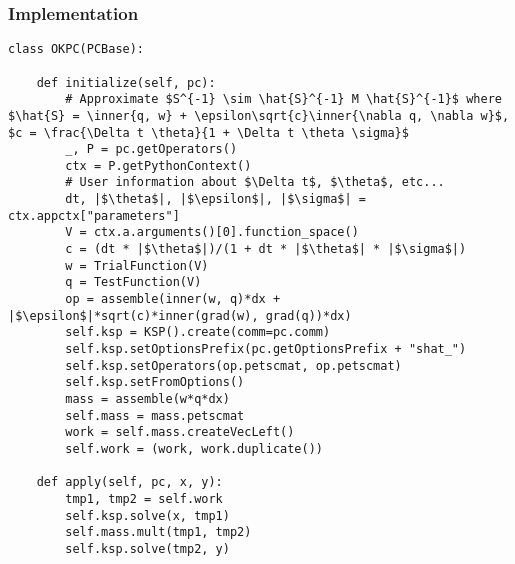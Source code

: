 \documentclass[presentation,aspectratio=43]{beamer}
\newcommand{\inner}[1]{\left\langle #1 \right \rangle}
\begin{document}
\begin{frame}[fragile]
  \frametitle{Implementation}
\begin{verbatim}
class OKPC(PCBase):

    def initialize(self, pc):
        # Approximate $S^{-1} \sim \hat{S}^{-1} M \hat{S}^{-1}$ where $\hat{S} = \inner{q, w} + \epsilon\sqrt{c}\inner{\nabla q, \nabla w}$, $c = \frac{\Delta t \theta}{1 + \Delta t \theta \sigma}$
        _, P = pc.getOperators()
        ctx = P.getPythonContext()
        # User information about $\Delta t$, $\theta$, etc...
        dt, |$\theta$|, |$\epsilon$|, |$\sigma$| = ctx.appctx["parameters"]
        V = ctx.a.arguments()[0].function_space()
        c = (dt * |$\theta$|)/(1 + dt * |$\theta$| * |$\sigma$|)
        w = TrialFunction(V)
        q = TestFunction(V)
        op = assemble(inner(w, q)*dx + |$\epsilon$|*sqrt(c)*inner(grad(w), grad(q))*dx)
        self.ksp = KSP().create(comm=pc.comm)
        self.ksp.setOptionsPrefix(pc.getOptionsPrefix + "shat_")
        self.ksp.setOperators(op.petscmat, op.petscmat)
        self.ksp.setFromOptions()
        mass = assemble(w*q*dx)
        self.mass = mass.petscmat
        work = self.mass.createVecLeft()
        self.work = (work, work.duplicate())

    def apply(self, pc, x, y):
        tmp1, tmp2 = self.work
        self.ksp.solve(x, tmp1)
        self.mass.mult(tmp1, tmp2)
        self.ksp.solve(tmp2, y)
\end{verbatim}
\end{frame}

\bgroup
{}
\end{document}
